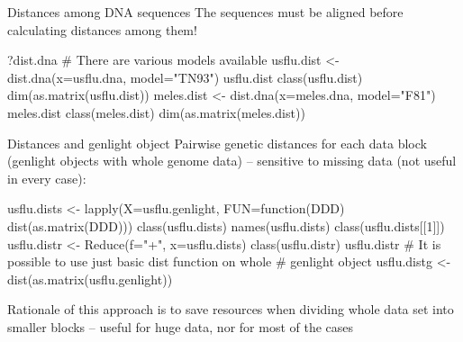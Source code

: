\documentclass[compress, ucs, xelatex, 11pt, xcolor=svgnames,
  hyperref={
    bookmarks=true,
    unicode=true,
    colorlinks=true,
    pdftitle={Molecular data in R},
    plainpages=false,
    pdfauthor={Vojtech Zeisek},
    pdfsubject={Course about phylogeny and evolution in R},
    pdfcreator={XeLaTeX},
    pdfkeywords={R, evolution, phylogeny, molecular data},
    linkcolor=Tomato,
    anchorcolor=SaddleBrown,
    citecolor=Goldenrod,
    filecolor=DarkMagenta,
    menucolor=Sienna,
    urlcolor=DarkTurquoise,
    pdftex},
  url={hyphens, lowtilde} %
  ]{beamer}
\begin{document}
\begin{frame}[fragile]{Distances among DNA sequences}
\alert{The sequences must be aligned before calculating distances among them!}
\vfill
  \begin{spluscode}
    ?dist.dna # There are various models available
    usflu.dist <- dist.dna(x=usflu.dna, model="TN93")
    usflu.dist
    class(usflu.dist)
    dim(as.matrix(usflu.dist))
    meles.dist <- dist.dna(x=meles.dna, model="F81")
    meles.dist
    class(meles.dist)
    dim(as.matrix(meles.dist))
  \end{spluscode}
\end{frame}

\begin{frame}[fragile]{Distances and genlight object}
Pairwise genetic distances for each data block (genlight objects with whole genome data) -- sensitive to missing data (not useful in every case):
\vfill
  \begin{spluscode}
    usflu.dists <- lapply(X=usflu.genlight, FUN=function(DDD)
      dist(as.matrix(DDD)))
    class(usflu.dists)
    names(usflu.dists)
    class(usflu.dists[[1]])
    usflu.distr <- Reduce(f="+", x=usflu.dists)
    class(usflu.distr)
    usflu.distr
    # It is possible to use just basic dist function on whole
    # genlight object
    usflu.distg <- dist(as.matrix(usflu.genlight))
  \end{spluscode}
\vfill
Rationale of this approach is to save resources when dividing whole data set into smaller blocks -- useful for huge data, nor for most of the cases
\end{frame}
\end{document}
